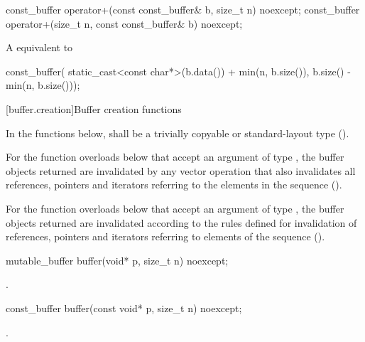 \begin{itemdecl}
const_buffer operator+(const const_buffer& b, size_t n) noexcept;
const_buffer operator+(size_t n, const const_buffer& b) noexcept;
\end{itemdecl}

\begin{itemdescr}
\pnum
\returns A  equivalent to
\begin{codeblock}
const_buffer(
  static_cast<const char*>(b.data()) + min(n, b.size()),
  b.size() - min(n, b.size()));
\end{codeblock}

\end{itemdescr}



[buffer.creation]{Buffer creation functions}

\pnum
In the functions below,  shall be a trivially copyable or standard-layout type ().


\pnum
For the function overloads below that accept an argument of type , the buffer objects returned are invalidated by any vector operation that also invalidates all references, pointers and iterators referring to the elements in the sequence ().

\pnum
For the function overloads below that accept an argument of type , the buffer objects returned are invalidated according to the rules defined for invalidation of references, pointers and iterators referring to elements of the sequence ().

%
\begin{itemdecl}
mutable_buffer buffer(void* p, size_t n) noexcept;
\end{itemdecl}

\begin{itemdescr}
\pnum
\returns {}.
\end{itemdescr}

\begin{itemdecl}
const_buffer buffer(const void* p, size_t n) noexcept;
\end{itemdecl}

\begin{itemdescr}
\pnum
\returns {}.
\end{itemdescr}

